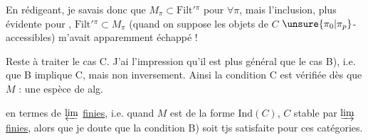 En rédigeant,  je savais donc que $M_\pi\subset\mathrm{Filt}'{}^\pi$ pour $\forall\pi$, mais l'inclusion, plus évidente pour  , $\mathrm{Filt}'{}^\pi\subset M_\pi$ (quand on suppose les objets de $C$ $\unsure{\pi_0|\pi_p}$-accessibles) m'avait apparemment échappé !

Reste à traiter le cas C. J'ai l'impression qu'il est  plus général que le cas B), i.e. que  B implique C, mais non inversement. Ainsi la condition C est vérifiée dès que $M$  : une espèce de  alg.   

en termes de $\varprojlim$ \uline{finies}, i.e. quand $M$ est de la forme $\mathrm{Ind}(C)$, $C$ stable par $\varinjlim$ \uline{finies}, alors que je doute que la condition B) soit tjs satisfaite pour ces catégories.

